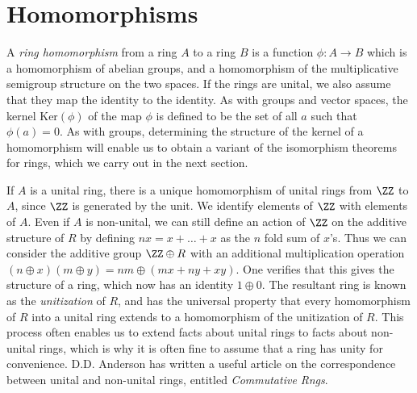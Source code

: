 \section{Homomorphisms}

A \emph{ring homomorphism} from a ring $A$ to a ring $B$ is a function $\phi:A \to B$ which is a homomorphism of abelian groups, and a homomorphism of the multiplicative semigroup structure on the two spaces. If the rings are unital, we also assume that they map the identity to the identity. As with groups and vector spaces, the kernel $\text{Ker}(\phi)$ of the map $\phi$ is defined to be the set of all $a$ such that $\phi(a) = 0$. As with groups, determining the structure of the kernel of a homomorphism will enable us to obtain a variant of the isomorphism theorems for rings, which we carry out in the next section.

\begin{example}
    If $A$ is a unital ring, there is a unique homomorphism of unital rings from $\ZZ$ to $A$, since $\ZZ$ is generated by the unit. We identify elements of $\ZZ$ with elements of $A$. Even if $A$ is non-unital, we can still define an action of $\ZZ$ on the additive structure of $R$ by defining $nx = x + \dots + x$ as the $n$ fold sum of $x$'s. Thus we can consider the additive group $\ZZ \oplus R$ with an additional multiplication operation $(n \oplus x)(m \oplus y) = nm \oplus (mx + ny + xy)$. One verifies that this gives the structure of a ring, which now has an identity $1 \oplus 0$. The resultant ring is known as the \emph{unitization} of $R$, and has the universal property that every homomorphism of $R$ into a unital ring extends to a homomorphism of the unitization of $R$. This process often enables us to extend facts about unital rings to facts about non-unital rings, which is why it is often fine to assume that a ring has unity for convenience. D.D. Anderson has written a useful article on the correspondence between unital and non-unital rings, entitled \emph{Commutative Rngs}.
\end{example}

